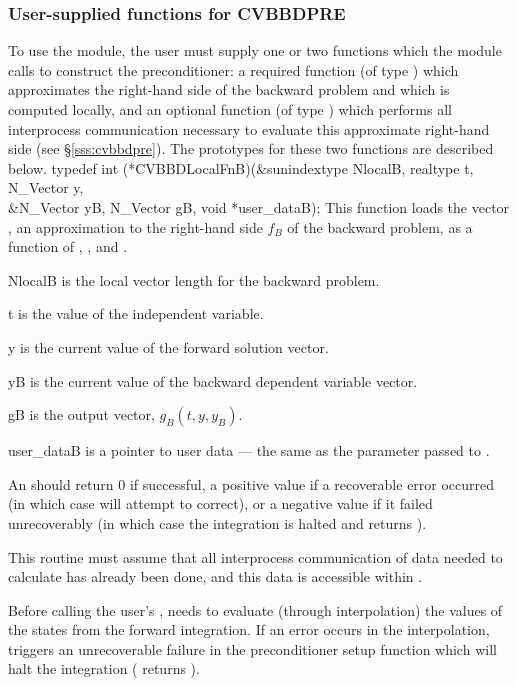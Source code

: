 \subsubsection{User-supplied functions for CVBBDPRE}
To use the {\cvbbdpre} module, the user must supply one or two functions which the
module calls to construct the preconditioner: a required function 
(of type ) which approximates the right-hand side of the backward
problem and which is computed locally, and an optional function 
(of type ) which performs all interprocess communication necessary
to evaluate this approximate right-hand side (see \S\ref{sss:cvbbdpre}).
The prototypes for these two functions are described below.
{
  typedef int (*CVBBDLocalFnB)(&sunindextype NlocalB, realtype t, N\_Vector y,\\
                               &N\_Vector yB, N\_Vector gB, void *user\_dataB);
}
{
  This  function loads the vector , an approximation to the
  right-hand side $f_B$ of the backward problem, as a function of , ,
  and .
}
{
  \begin{args}
  \item[NlocalB]
    is the local vector length for the backward problem.
  \item[t]
    is the value of the independent variable.
  \item[y]
    is the current value of the forward solution vector.
  \item[yB]
    is the current value of the backward dependent variable vector.
  \item[gB]
    is the output vector, $g_B(t, y, y_B)$.
  \item[user\_dataB]
    is a pointer to user data --- the same as the 
    parameter passed to .
  \end{args}
}
{
  An  should return 0 if successful, a positive value if a recoverable
  error occurred (in which case {\cvodes} will attempt to correct), or a negative
  value if it failed unrecoverably (in which case the integration is halted and
   returns ).
}
{
  This routine must assume that all interprocess communication of data needed to
  calculate  has already been done, and this data is accessible within
  .

  {\warn}Before calling the user's , {\cvodes} needs to evaluate
  (through interpolation) the values of the states from the forward integration.
  If an error occurs in the interpolation, {\cvodes} triggers an unrecoverable
  failure in the preconditioner setup function which will halt the integration
  ( returns ).
}
